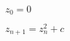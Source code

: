 \documentclass[preview]{standalone}
\begin{document}
\begin{align*}
z_0 = 0 \\\\ z_{n+1} = z_n^2 + c
\end{align*}
\end{document}

